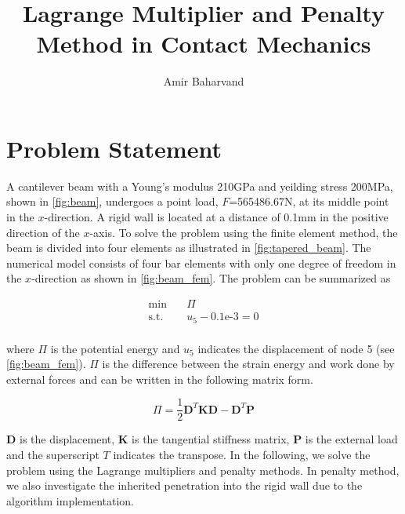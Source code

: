 \documentclass{article}
\title{Lagrange Multiplier and Penalty Method in Contact Mechanics}
\author{Amir Baharvand }
\date{}
\begin{document}
\maketitle

\section{Problem Statement}
 A cantilever beam with a Young's modulus 210GPa and yeilding stress 200MPa, shown in \cref{fig:beam}, undergoes a point load, $F$=565486.67N, at its middle point in the $x$-direction. A rigid wall is located at a distance of 0.1mm in the positive direction of the $x$-axis. To solve the problem using the finite element method, the beam is divided into four elements as illustrated in \cref{fig:tapered_beam}. The numerical model consists of four bar elements with only one degree of freedom in the $x$-direction as shown in \cref{fig:beam_fem}. The problem can be summarized as 
 
 \begin{equation}
     \begin{aligned}
    \min \quad & \Pi\\
    \textrm{s.t.} \quad & u_5 - 0.1\text{e-3} = 0\\
    \end{aligned}
    \label{eq:problem}
\end{equation}

where $\Pi$ is the potential energy and $u_5$ indicates the displacement of node 5 (see \cref{fig:beam_fem}). $\Pi$ is the difference between the strain energy and work done by external forces and can be written in the following matrix form.

\begin{equation}
    \Pi = \dfrac{1}{2} \mathbf{D}^{T} \mathbf{K} \mathbf{D} -  \mathbf{D}^{T}  \mathbf{P}
    \label{eq:potential_energy}
\end{equation}

$\mathbf{D}$ is the displacement, $\mathbf{K}$ is the tangential stiffness matrix, $\mathbf{P}$ is the external load and the superscript $T$ indicates the transpose. In the following, we solve the problem using the Lagrange multipliers and penalty methods. In penalty method, we also investigate the inherited penetration into the rigid wall due to the algorithm implementation. 
 
\end{document}
